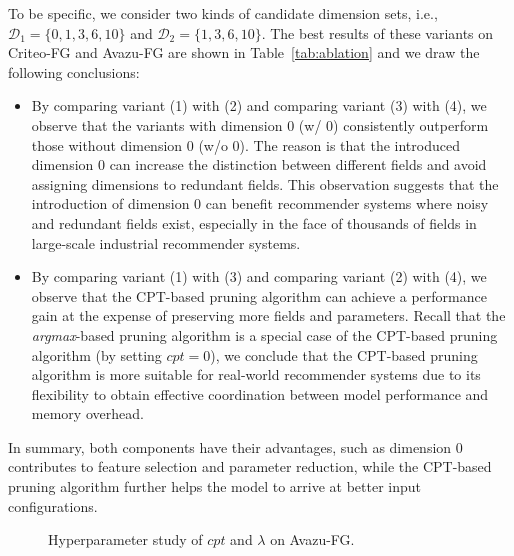 \documentclass[10pt,journal,compsoc]{IEEEtran}
\begin{document}
To be specific, we consider two kinds of candidate dimension sets, i.e., $\mathcal{D}_1=\{0, 1, 3, 6, 10\}$ and $\mathcal{D}_2=\{1, 3, 6, 10\}$. The best results of these variants on Criteo-FG and Avazu-FG are shown in Table~\ref{tab:ablation} and we draw the following conclusions:
\begin{itemize}
    \item By comparing variant (1) with (2) and comparing variant (3) with (4), we observe that the variants with dimension 0 (w/ 0) consistently outperform those without dimension 0 (w/o 0). The reason is that the introduced dimension 0 can increase the distinction between different fields and avoid assigning dimensions to redundant fields. 
    This observation suggests that the introduction of dimension 0 can benefit recommender systems where noisy and redundant fields exist, especially in the face of thousands of fields in large-scale industrial recommender systems.
   \item By comparing variant (1) with (3) and comparing variant (2) with (4), we observe that the CPT-based pruning algorithm can achieve a performance gain at the expense of preserving more fields and parameters. Recall that the \emph{argmax}-based pruning algorithm is a special case of the CPT-based pruning algorithm (by setting $cpt = 0$), we conclude that the CPT-based pruning algorithm is more suitable for real-world recommender systems due to its flexibility to obtain effective coordination between model performance and memory overhead.
\end{itemize}

In summary, both components have their advantages, such as dimension 0 contributes to feature selection and parameter reduction, while the CPT-based pruning algorithm further helps the model to arrive at better input configurations.

\begin{figure}[tbh!]
    \centering
    \vspace{-3ex}
    \caption{Hyperparameter study of $cpt$ and $\lambda$ on Avazu-FG.}
    \label{fig:lamda}
    \vspace{-3ex}
\end{figure}
\end{document}
